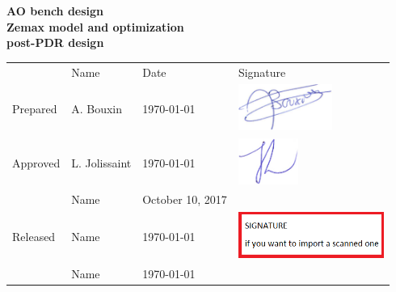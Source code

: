 \setcounter{page}{1}
\fancyhf{}
\phantom{bla}

\begin{center}
{\LARGE\textbf{AO bench design}} \\
\vspace{2mm}
{\LARGE\textbf{Zemax model and optimization}} \\
\vspace{2mm}
{\LARGE\textbf{post-PDR design}}\\
\end{center}

\begin{center}
\setlength\extrarowheight{20pt}
\begin{tabular}{p{2cm}p{3cm}p{4cm}p{3cm}}
 & Name & Date & Signature\\
Prepared &  A. Bouxin & \today & \begin{minipage}{.2\textwidth}
\includegraphics[width=\linewidth,height=15mm]{def/signatureAudreyBouxin.PNG}
\end{minipage} \\
Approved & L. Jolissaint & \today & \begin{minipage}{.2\textwidth}
\includegraphics[width=\linewidth,height=15mm]{def/signatureLaurentAutographe.jpg}
\end{minipage} \\
& Name & October 10, 2017 & \dotfill \\
Released & Name & \today & \begin{minipage}{.2\textwidth}
\includegraphics[width=\linewidth,height=15mm]{def/signature.PNG}
\end{minipage} \\
& Name & \today & \dotfill \\
\end{tabular}
\end{center}


